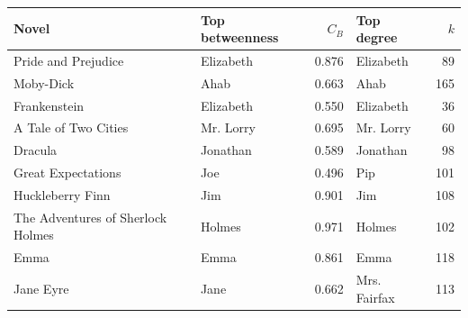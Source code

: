 \begin{tabular}{llrlr}
\toprule
Novel & Top betweenness & $C_B$ & Top degree & $k$ \\
\midrule
Pride and Prejudice & Elizabeth & 0.876 & Elizabeth & 89 \\
Moby-Dick & Ahab & 0.663 & Ahab & 165 \\
Frankenstein & Elizabeth & 0.550 & Elizabeth & 36 \\
A Tale of Two Cities & Mr. Lorry & 0.695 & Mr. Lorry & 60 \\
Dracula & Jonathan & 0.589 & Jonathan & 98 \\
Great Expectations & Joe & 0.496 & Pip & 101 \\
Huckleberry Finn & Jim & 0.901 & Jim & 108 \\
The Adventures of Sherlock Holmes & Holmes & 0.971 & Holmes & 102 \\
Emma & Emma & 0.861 & Emma & 118 \\
Jane Eyre & Jane & 0.662 & Mrs. Fairfax & 113 \\
\bottomrule
\end{tabular}